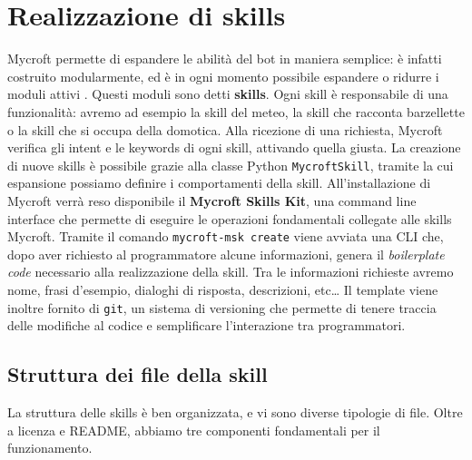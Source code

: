 \chapter{Realizzazione di skills}
\label{chap:skills}
Mycroft permette di espandere le abilità del bot in maniera semplice: è infatti costruito modularmente, ed è in ogni momento possibile espandere o ridurre i moduli attivi \cite{docs:mycroft}.
Questi moduli sono detti \textbf{skills}. Ogni skill è responsabile di una funzionalità: avremo ad esempio la skill del meteo, la skill che racconta barzellette o la skill che si occupa della domotica. Alla ricezione di una richiesta, Mycroft verifica gli intent e le keywords di ogni skill, attivando quella giusta.
La creazione di nuove skills è possibile grazie alla classe Python \texttt{MycroftSkill}, tramite la cui espansione possiamo definire i comportamenti della skill. All'installazione di Mycroft verrà reso disponibile il \textbf{Mycroft Skills Kit}, una command line interface che permette di eseguire le operazioni fondamentali collegate alle skills Mycroft. Tramite il comando \texttt{mycroft-msk create} viene avviata una CLI che, dopo aver richiesto al programmatore alcune informazioni, genera il \textit{boilerplate code} necessario alla realizzazione della skill. Tra le informazioni richieste avremo nome, frasi d'esempio, dialoghi di risposta, descrizioni, etc\dots
Il template viene inoltre fornito di \texttt{git}, un sistema di versioning che permette di tenere traccia delle modifiche al codice e semplificare l'interazione tra programmatori.
\section{Struttura dei file della skill}
La struttura delle skills è ben organizzata, e vi sono diverse tipologie di file. Oltre a licenza e README, abbiamo tre componenti fondamentali per il funzionamento.
